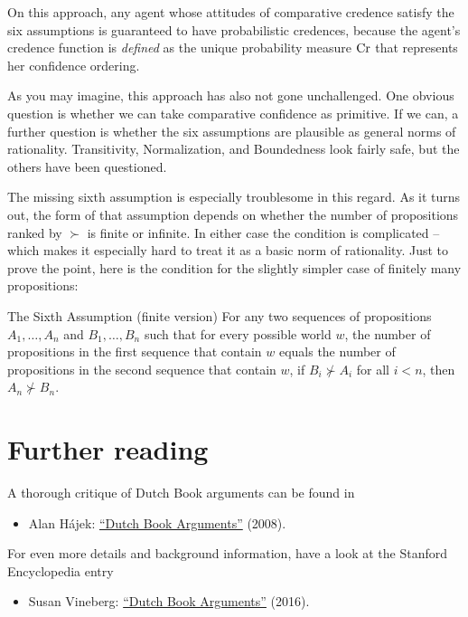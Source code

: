 On this approach, any agent whose attitudes of comparative credence
satisfy the six assumptions is guaranteed to have probabilistic
credences, because the agent's credence function is \emph{defined} as
the unique probability measure $\text{Cr}$ that represents her confidence
ordering.

As you may imagine, this approach has also not gone unchallenged. One
obvious question is whether we can take comparative confidence as
primitive. If we can, a further question is whether the six
assumptions are plausible as general norms of
rationality. Transitivity, Normalization, and Boundedness look fairly
safe, but the others have been questioned. 

The missing sixth assumption is especially troublesome in this
regard. As it turns out, the form of that assumption depends on
whether the number of propositions ranked by $\succ$ is finite or
infinite. In either case the condition is complicated -- which makes
it especially hard to treat it as a basic norm of rationality. Just to
prove the point, here is the condition for the slightly simpler case
of finitely many propositions:

\begin{genericthm}{The Sixth Assumption (finite version)}
  For any two sequences of propositions $A_1,\ldots,A_n$ and
  $B_1,\ldots,B_n$ such that for every possible world $w$, the number of
  propositions in the first sequence that contain $w$ equals the
  number of propositions in the second sequence that contain $w$, if
  $B_i \not\succ A_i$ for all $i < n$, then $A_n \not\succ B_n$.
\end{genericthm}



\section{Further reading}

A thorough critique of Dutch Book arguments can be found in
%
\begin{itemize}
\item Alan H\'ajek: \href{http://philrsss.anu.edu.au/people-defaults/alanh/papers/DBA.pdf}{``Dutch Book Arguments''} (2008).
\end{itemize}
%
For even more details and background information, have a look at the
Stanford Encyclopedia entry
%
\begin{itemize}
\item Susan Vineberg: \href{https://plato.stanford.edu/entries/dutch-book/}{``Dutch Book Arguments''} (2016).
\end{itemize}

